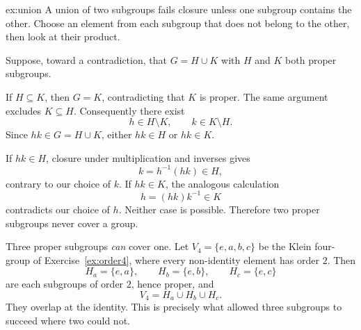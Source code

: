 \begin{solution}{ex:union}
\idea A union of two subgroups fails closure unless one subgroup contains the other. Choose an element from each subgroup that does not belong to the other, then look at their product.

\writeup Suppose, toward a contradiction, that $G=H\cup K$ with $H$ and $K$ both proper subgroups.

If $H\subseteq K$, then $G=K$, contradicting that $K$ is proper. The same argument excludes $K\subseteq H$. Consequently there exist
\[
h\in H\setminus K,\qquad k\in K\setminus H.
\]
Since $hk\in G=H\cup K$, either $hk\in H$ or $hk\in K$.

If $hk\in H$, closure under multiplication and inverses gives
\[
k=h^{-1}(hk)\in H,
\]
contrary to our choice of $k$. If $hk\in K$, the analogous calculation
\[
h=(hk)k^{-1}\in K
\]
contradicts our choice of $h$. Neither case is possible. Therefore two proper subgroups never cover a group.

Three proper subgroups \emph{can} cover one. Let $V_4=\{e,a,b,c\}$ be the Klein four-group of Exercise~\ref{ex:order4}, where every non-identity element has order $2$. Then
\[
H_a=\{e,a\},\qquad H_b=\{e,b\},\qquad H_c=\{e,c\}
\]
are each subgroups of order $2$, hence proper, and
\[
V_4=H_a\cup H_b\cup H_c.
\]
They overlap at the identity. This is precisely what allowed three subgroups to succeed where two could not.
\end{solution}

